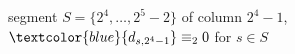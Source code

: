 
\begin{figure}[p]

    \noindent{}

    \captionsetup{singlelinecheck=off}
    \caption[.]{ segment $S=\lbrace2^{4},\ldots,2^{5}-2\rbrace$ of column $2^{4}-1$,
        $\textcolor{blue}{d_{s,2^{4}-1}}\equiv_{2}0$ for $s\in S$}



    \label{fig:mirror-segment}

\end{figure}

